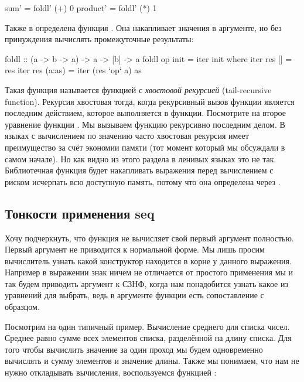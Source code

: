 \begin{code}
sum'        = foldl' (+) 0
product'    = foldl' (*) 1
\end{code}

Также в  определена функция . Она накапливает
значения в аргументе, но без принуждения вычислять промежуточные
результаты:


\begin{code}
foldl :: (a -> b -> a) -> a -> [b] -> a
foldl op init = iter init
    where iter res []        = res
          iter res (a:as)    = iter (res `op` a) as 
\end{code}

Такая функция называется функцией с \emph{хвостовой рекурсией}
(tail-recursive function). Рекурсия хвостовая тогда, когда рекурсивный
вызов функции является последним действием, которое выполняется в
функции. Посмотрите на второе уравнение функции . Мы вызываем
функцию  рекурсивно последним делом. В языках с вычислением по
значению часто хвостовая рекурсия имеет преимущество за счёт экономии
памяти (тот момент который мы обсуждали в самом начале). Но как видно из
этого раздела в ленивых языках это не так. Библиотечная функция 
будет накапливать выражения перед вычислением с риском исчерпать всю
доступную память, потому что она определена через .

\subsection{Тонкости применения seq}

Хочу подчеркнуть, что функция  не вычисляет свой первый аргумент
полностью. Первый аргумент не приводится к нормальной форме. Мы лишь
просим вычислитель узнать какой конструктор находится в корне у данного
выражения. Например в выражении  знак \In{$!}
ничем не отличается от простого применения мы и так будем приводить
аргумент  к СЗНФ, когда нам понадобится узнать какое из
уравнений для  выбрать, ведь в аргументе функции есть
сопоставление с образцом.

Посмотрим на один типичный пример. Вычисление среднего для списка чисел.
Среднее равно сумме всех элементов списка, разделённой на длину списка.
Для того чтобы вычислить значение за один проход мы будем одновременно
вычислять и сумму элементов и значение длины. Также мы понимаем, что нам
не нужно откладывать вычисления, воспользуемся функцией :


